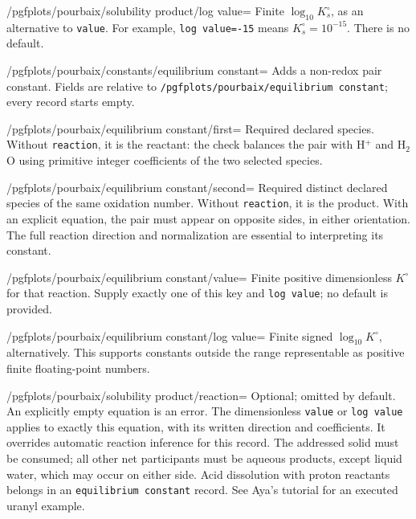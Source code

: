\documentclass[a4paper,11pt]{ltxdoc}
\begin{document}
\begin{key}{/pgfplots/pourbaix/solubility product/log value=}
Finite $\log_{10}K_s^\circ$, as an alternative to \texttt{value}. For example,
\texttt{log value=-15} means $K_s^\circ=10^{-15}$. There is no default.
\end{key}
\begin{key}{/pgfplots/pourbaix/constants/equilibrium constant=}
Adds a non-redox pair constant. Fields are relative to
\texttt{/pgfplots/pourbaix/equilibrium constant}; every record starts empty.
\end{key}
\begin{key}{/pgfplots/pourbaix/equilibrium constant/first=}
Required declared species. Without \texttt{reaction}, it is the reactant:
the check balances the pair with H$^+$ and H$_2$O
using primitive integer coefficients of the two selected species.
\end{key}
\begin{key}{/pgfplots/pourbaix/equilibrium constant/second=}
Required distinct declared species of the same oxidation number. Without
\texttt{reaction}, it is the product. With an explicit equation, the pair must
appear on opposite sides, in either orientation. The full
reaction direction and normalization are essential to interpreting its constant.
\end{key}
\begin{key}{/pgfplots/pourbaix/equilibrium constant/value=}
Finite positive dimensionless $K^\circ$ for that reaction. Supply exactly one
of this key and \texttt{log value}; no default is provided.
\end{key}
\begin{key}{/pgfplots/pourbaix/equilibrium constant/log value=}
Finite signed $\log_{10}K^\circ$, alternatively. This supports constants outside
the range representable as positive finite floating-point numbers.
\end{key}
\begin{key}{/pgfplots/pourbaix/solubility product/reaction=}
Optional; omitted by default. An explicitly empty equation is an error.
The dimensionless \texttt{value} or
\texttt{log value} applies to exactly this equation, with its written direction
and coefficients. It overrides automatic reaction inference for this record.
The addressed solid must be consumed; all other net participants must be aqueous
products, except liquid water, which may occur on either side. Acid dissolution
with proton reactants belongs in an \texttt{equilibrium constant} record.
See Aya's tutorial for an executed uranyl example.
\end{key}
\end{document}
